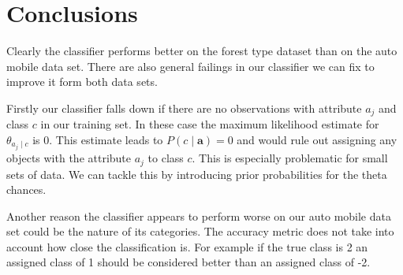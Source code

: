 \section{Conclusions}

Clearly the classifier performs better on the forest type dataset than on the auto mobile data set.
There are also general failings in our classifier we can fix to improve it form both data sets.

Firstly our classifier falls down if there are no observations with attribute $a_j$ and class $c$ in our training set. In these case the maximum likelihood estimate for $\theta_{a_j \mid c}$ is $0$.
This estimate leads to $P(c \mid \mathbf{a}) = 0$ and would rule out assigning any objects with the attribute $a_j$ to class $c$.
This is especially problematic for small sets of data.
We can tackle this by introducing prior probabilities for the theta chances.

Another reason the classifier appears to perform worse on our auto mobile data set could be the nature of its categories.
The accuracy metric does not take into account how close the classification is.
For example if the true class is 2 an assigned class of 1 should be considered better than an assigned class of -2.

